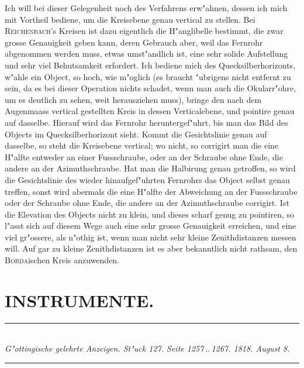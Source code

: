 \documentclass[12pt,a4paper]{article}
\begin{document}
Ich will bei dieser Gelegenheit noch des Verfahrens erw"ahnen, dessen ich mich mit Vortheil bediene,
um die Kreisebene genau vertical zu stellen. Bei \textsc{Reichenbach}'s Kreisen ist dazu eigentlich die
H"anglibelle bestimmt, die zwar grosse Genauigkeit geben kann, deren Gebrauch aber, weil das Fernrohr
abgenommen werden muss, etwas umst"andlich ist, eine sehr solide Aufstellung und sehr viel Behutsamkeit
erfordert. Ich bediene mich des Quecksilberhorizonts, w"ahle ein Object, so hoch, wie m"oglich (es braucht
"ubrigens nicht entfernt zu sein, da es bei dieser Operation nichts schadet, wenn man auch die Okularr"ohre,
um es deutlich zu sehen, weit herausziehen muss), bringe den nach dem Augenmaass vertical gestellten
Kreis in dessen Verticalebene, und pointire genau auf dasselbe. Hierauf wird das Fernrohr heruntergef"uhrt,
bis man das Bild des Objects im Quecksilberhorizont sieht. Kommt die Gesichtslinie genau auf dasselbe,
so steht die Kreisebene vertical; wo nicht, so corrigirt man die eine H"alfte entweder an einer Fussschraube,
oder an der Schraube ohne Ende, die andere an der Azimuthschraube. Hat man die Halbirung genau
getroffen, so wird die Gesichtslinie des wieder hinaufgef"uhrten Fernrohrs das Object selbst genau treffen,
sonst wird abermals die eine H"alfte der Abweichung an der Fussschraube oder der Schraube ohne Ende,
die andere an der Azimuthschraube corrigirt. Ist die Elevation des Objects nicht zu klein, und dieses
scharf genug zu pointiren, so l"asst sich auf diesem Wege auch eine sehr grosse Genauigkeit erreichen,
und eine viel gr"ossere, als n"othig ist, wenn man nicht sehr kleine Zenithdistanzen messen will. Auf gar
zu kleine Zenithdistanzen ist es aber bekanntlich nicht rathsam, den \textsc{Borda}ischen Kreis anzuwenden.

\newpage

\section*{INSTRUMENTE.}

\begin{center}
\rule{0.6\textwidth}{0.4pt}\\[0.5em]
\textit{G"ottingische gelehrte Anzeigen. St"uck 127. Seite 1257\,..\,1267. 1818. August 8.}\\[0.3em]
\rule{0.6\textwidth}{0.4pt}
\end{center}
\end{document}
